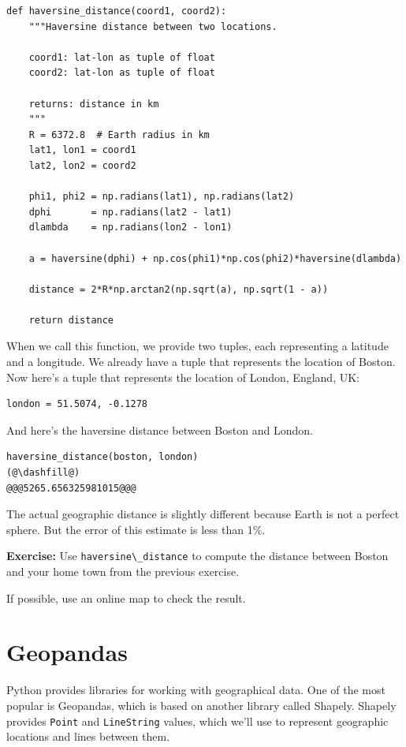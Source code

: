 \begin{lstlisting}[]
def haversine_distance(coord1, coord2):
    """Haversine distance between two locations.
    
    coord1: lat-lon as tuple of float 
    coord2: lat-lon as tuple of float
    
    returns: distance in km
    """
    R = 6372.8  # Earth radius in km
    lat1, lon1 = coord1
    lat2, lon2 = coord2
    
    phi1, phi2 = np.radians(lat1), np.radians(lat2) 
    dphi       = np.radians(lat2 - lat1)
    dlambda    = np.radians(lon2 - lon1)
    
    a = haversine(dphi) + np.cos(phi1)*np.cos(phi2)*haversine(dlambda)
    
    distance = 2*R*np.arctan2(np.sqrt(a), np.sqrt(1 - a))
    
    return distance
\end{lstlisting}

When we call this function, we provide two tuples, each representing a
latitude and a longitude. We already have a tuple that represents the
location of Boston. Now here's a tuple that represents the location of
London, England, UK:

\begin{lstlisting}[]
london = 51.5074, -0.1278
\end{lstlisting}

And here's the haversine distance between Boston and London.

\begin{lstlisting}[]
haversine_distance(boston, london)
(@\dashfill@)
@@@5265.656325981015@@@
\end{lstlisting}

The actual geographic distance is slightly different because Earth is
not a perfect sphere. But the error of this estimate is less than 1\%.

\textbf{Exercise:} Use \passthrough{\lstinline!haversine\_distance!} to
compute the distance between Boston and your home town from the previous
exercise.

If possible, use an online map to check the result.

\hypertarget{geopandas}{%
\section{Geopandas}\label{geopandas}}

Python provides libraries for working with geographical data. One of the
most popular is Geopandas, which is based on another library called
Shapely. Shapely provides \passthrough{\lstinline!Point!} and
\passthrough{\lstinline!LineString!} values, which we'll use to
represent geographic locations and lines between them.

